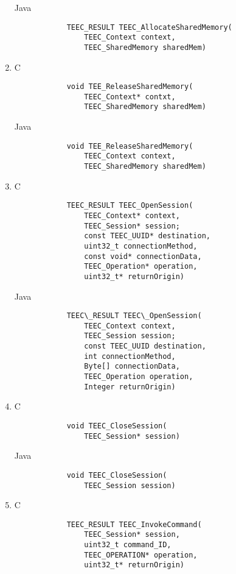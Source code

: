 \documentclass{cseminar}
\begin{document}
\begin{enumerate}
		  Java
		  	\begin{lstlisting}
		  	TEEC_RESULT TEEC_AllocateSharedMemory(
				TEEC_Context context,
				TEEC_SharedMemory sharedMem)
			\end{lstlisting}


	\item C
			\begin{lstlisting}
			void TEE_ReleaseSharedMemory(
				TEEC_Context* contxt,
				TEEC_SharedMemory sharedMem)
			\end{lstlisting}
		  
		  Java
		  	\begin{lstlisting}
		  	void TEE_ReleaseSharedMemory(
				TEEC_Context context,
				TEEC_SharedMemory sharedMem)
			\end{lstlisting}


	\item C
			\begin{lstlisting}
			TEEC_RESULT TEEC_OpenSession(
				TEEC_Context* context,
				TEEC_Session* session;
				const TEEC_UUID* destination,
				uint32_t connectionMethod,
				const void* connectionData,
				TEEC_Operation* operation,
				uint32_t* returnOrigin)
			\end{lstlisting}
		  
		  Java
		  	\begin{lstlisting}
		  	TEEC\_RESULT TEEC\_OpenSession(
				TEEC_Context context,
				TEEC_Session session;
				const TEEC_UUID destination,
				int connectionMethod,
				Byte[] connectionData,
				TEEC_Operation operation,
				Integer returnOrigin)
			\end{lstlisting}


	\item C
			\begin{lstlisting}
			void TEEC_CloseSession(
				TEEC_Session* session)
			\end{lstlisting}
		  
		  Java
		  	\begin{lstlisting}
		  	void TEEC_CloseSession(
				TEEC_Session session)
			\end{lstlisting}



	\item C
			\begin{lstlisting}
			TEEC_RESULT TEEC_InvokeCommand(
				TEEC_Session* session,
				uint32_t command_ID,
				TEEC_OPERATION* operation,
				uint32_t* returnOrigin)
			\end{lstlisting}
		  

\end{enumerate}
\end{document}
